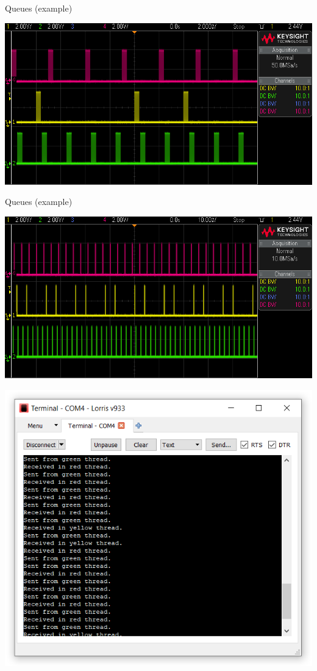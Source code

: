 \documentclass[
aspectratio=169,
]{beamer}
\begin{document}
\begin{frame}{Queues (example)}
	\begin{center}
		\includegraphics[width=.9\textwidth]{img/scope_10b.png}
	\end{center}
\end{frame}

\begin{frame}{Queues (example)}
	\begin{center}
		\includegraphics[width=.9\textwidth]{img/scope_10c.png}
	\end{center}
\end{frame}

\begin{frame}
	\begin{center}
		\includegraphics[width=.6\textwidth]{img/queueLorris.png}
	\end{center}
\end{frame}
\end{document}
